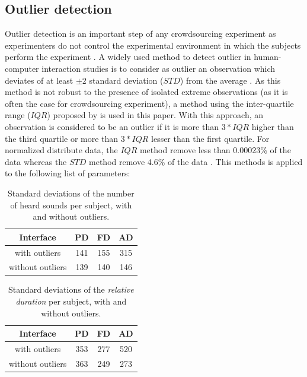 \documentclass{aes2e}
\begin{document}
\subsection{Outlier detection}
Outlier detection is an important step of any crowdsourcing experiment as experimenters do not control the experimental environment in which the subjects perform the experiment \cite{komarov2013crowdsourcing}\cite{buchholz2011crowdsourcing}. A widely used method to detect outlier in  human-computer interaction studies is to consider as outlier an observation  which deviates of at least $\pm2$ standard deviation ($STD$) from the average \cite{komarov2013crowdsourcing}. As this method is not robust to the presence of isolated extreme observations (as it is often the case for crowdsourcing experiment), a method using the inter-quartile range ($IQR$) proposed by \cite{komarov2013crowdsourcing} is used in this paper. With this approach, an observation is considered to be an outlier if it is more than $3*IQR$ higher than the third quartile or more than $3*IQR$ lesser than the first quartile. For normalized distribute data, the $IQR$ method remove less than 0.00023\% of the data whereas the  $STD$ method remove 4.6\% of the data \cite{komarov2013crowdsourcing}. This methods is applied to the following list of parameters:

 \begin{table}[t]
\caption{\label{tab1} Standard deviations of the number of heard sounds per subject, with and without outliers.}
\begin{center}
\begin{tabular}{cccc}
Interface &  PD &  FD& AD \\
\hline
with outliers & 141 & 155 & 315 \\
without outliers & 139 & 140 & 146 \\  
\hline
\end{tabular}
\end{center}
\end{table} 
\begin{table}[t]
\caption{\label{tab2} Standard deviations of the \textit{relative duration} per subject, with and without outliers.}
\begin{center}
\begin{tabular}{cccc}
Interface &  PD &  FD &  AD \\
\hline
with outliers & 353 & 277 & 520 \\
without outliers & 363 & 249 & 273 \\  
\hline
\end{tabular}
\end{center}
\end{table} 
\end{document}
